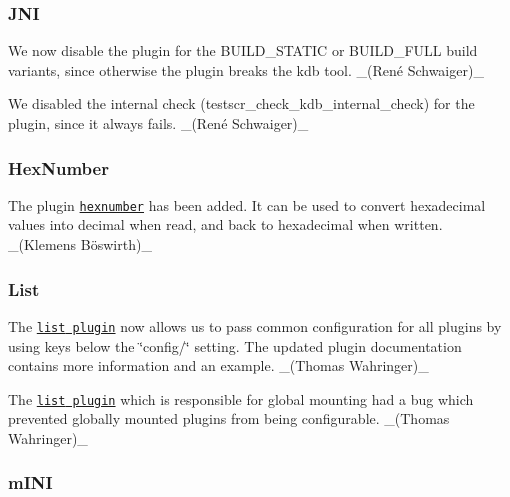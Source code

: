 \subsubsection*{J\+NI}


\begin{DoxyItemize}
\item We now disable the plugin for the {\ttfamily B\+U\+I\+L\+D\+\_\+\+S\+T\+A\+T\+IC} or {\ttfamily B\+U\+I\+L\+D\+\_\+\+F\+U\+LL} build variants, since otherwise the plugin breaks the {\ttfamily kdb} tool. \+\_\+(René Schwaiger)\+\_\+
\item We disabled the internal check ({\ttfamily testscr\+\_\+check\+\_\+kdb\+\_\+internal\+\_\+check}) for the plugin, since it always fails. \+\_\+(René Schwaiger)\+\_\+
\end{DoxyItemize}

\subsubsection*{Hex\+Number}


\begin{DoxyItemize}
\item The plugin \href{https://www.libelektra.org/plugins/hexnumber}{\tt hexnumber} has been added. It can be used to convert hexadecimal values into decimal when read, and back to hexadecimal when written. \+\_\+(Klemens Böswirth)\+\_\+
\end{DoxyItemize}

\subsubsection*{List}


\begin{DoxyItemize}
\item The \href{http://libelektra.org/plugins/list}{\tt {\ttfamily list} plugin} now allows us to pass common configuration for all plugins by using keys below the \char`\"{}config/\char`\"{} setting. The updated plugin documentation contains more information and an example. \+\_\+(\+Thomas Wahringer)\+\_\+
\item The \href{http://libelektra.org/plugins/list}{\tt {\ttfamily list} plugin} which is responsible for global mounting had a bug which prevented globally mounted plugins from being configurable. \+\_\+(\+Thomas Wahringer)\+\_\+
\end{DoxyItemize}

\subsubsection*{m\+I\+NI}


